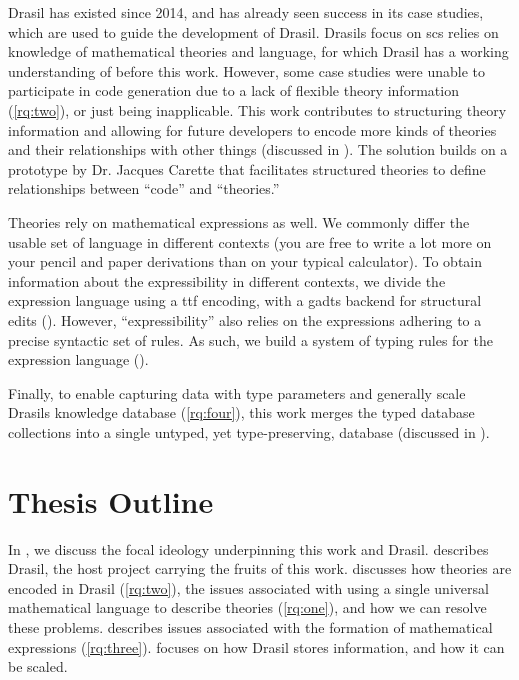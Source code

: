 Drasil has existed since 2014, and has already seen success in its case studies,
which are used to guide the development of Drasil. Drasils focus on \acs{scs}
relies on knowledge of mathematical theories and language, for which Drasil has
a working understanding of before this work. However, some case studies were
unable to participate in code generation due to a lack of flexible theory
information (\ref{rq:two}), or just being inapplicable. This work contributes to
structuring theory information and allowing for future developers to encode more
kinds of theories and their relationships with other things (discussed in
). The solution builds on a prototype by Dr. Jacques
Carette that facilitates
structured theories to define relationships between ``code'' and ``theories.''

Theories rely on mathematical expressions as well. We commonly differ the usable
set of language in different contexts (you are free to write a lot more on your
pencil and paper derivations than on your typical calculator). To obtain
information about the expressibility in different contexts, we divide the
expression language using a \acs{ttf} \cite{Carette2009} encoding, with a
\acsp{gadt} backend for structural edits (). However,
``expressibility'' also relies on the expressions adhering to a precise
syntactic set of rules. As such, we build a system of typing rules for the
expression language ().

Finally, to enable capturing data with type parameters and generally scale
Drasils knowledge database (\ref{rq:four}), this work merges the typed database
collections into a single untyped, yet type-preserving, database (discussed in
).

\section{Thesis Outline}
\label{sec:intro:outline}

In , we discuss the focal ideology underpinning this work
and Drasil.  describes Drasil, the host project carrying the
fruits of this work.  discusses how theories are encoded
in Drasil (\ref{rq:two}), the issues associated with using a single universal
mathematical language to describe theories (\ref{rq:one}), and how we can
resolve these problems.  describes issues associated with
the formation of mathematical expressions (\ref{rq:three}).
 focuses on how Drasil stores information, and how it
can be scaled.
